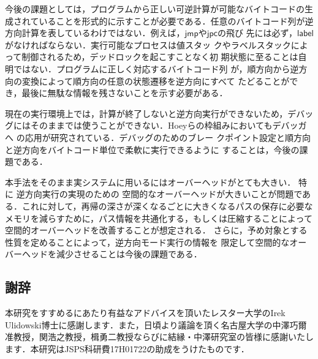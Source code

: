 \documentclass[submit,PRO]{ipsj}
\newcommand{\bcode}[1]{$\mathsf{#1}$}
\begin{document}
今後の課題としては，プログラムから正しい可逆計算が可能なバイトコードの生
成されていることを形式的に示すことが必要である．任意のバイトコード列が逆
方向計算を表しているわけではない．例えば，\bcode{jmp}や\bcode{jpc}の飛び
先には必ず，\bcode{label}がなければならない．実行可能なプロセスは値スタッ
クやラベルスタックによって制御されるため，デッドロックを起こすことなく初
期状態に至ることは自明ではない．プログラムに正しく対応するバイトコード列
が，順方向から逆方向の変換によって順方向の任意の状態遷移を逆方向にすべて
たどることができ，最後に無駄な情報を残さないことを示す必要がある．

現在の実行環境上では，計算が終了しないと逆方向実行ができないため，デバッ
グにはそのままでは使うことができない．Hoeyらの枠組みにおいてもデバッガへ
の応用が研究されている\cite{DBLP:conf/rc/HoeyU19}．デバッグのためのブレー
クポイント設定と順方向と逆方向をバイトコード単位で柔軟に実行できるように
することは，今後の課題である．

本手法をそのまま実システムに用いるにはオーバーヘッドがとても大きい．
特に%
逆方向実行の実現のための%
空間的なオーバーヘッドが大きいことが問題である．これに対して，再帰の深さが深くなるごとに大きくなるパスの保存に必要なメモリを減らすために，パス情報を共通化する，もしくは圧縮することによって空間的オーバーヘッドを改善することが想定される．
さらに，予め対象とする性質を定めることによって，逆方向モード実行の情報を
限定して空間的なオーバーヘッドを減少させることは今後の課題である．

\subsection*{謝辞}

本研究をすすめるにあたり有益なアドバイスを頂いたレスター大学のIrek
Ulidowski博士に感謝します．また，日頃より議論を頂く名古屋大学の中澤巧爾
准教授，関浩之教授，楫勇二教授ならびに結縁・中澤研究室の皆様に感謝いたし
ます．本研究はJSPS科研費17H01722の助成をうけたものです．




\begin{biography}
\end{biography}
\end{document}
